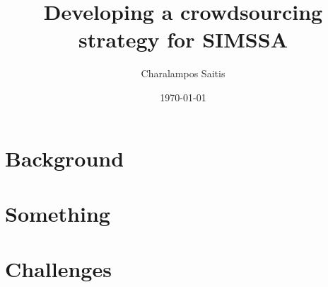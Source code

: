 \documentclass[letter,11pt,normalheadings]{scrreprt}
\title{Developing a crowdsourcing strategy for SIMSSA}
\author{Charalampos Saitis}
\date{\today}
\begin{document}
\maketitle


\section{Background}
\lipsum[1]

\section{Something}
\lipsum[1]

\section{Challenges}
\lipsum[1]
\end{document}
